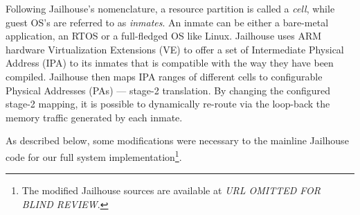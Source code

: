Following Jailhouse's nomenclature, a resource partition is called a
\emph{cell}, while guest OS's are referred to as \emph{inmates}. An
inmate can be either a bare-metal application, an RTOS or a
full-fledged OS like Linux. Jailhouse uses ARM hardware Virtualization
Extensions (VE) to offer a set of Intermediate Physical Address (IPA)
to its inmates that is compatible with the way they have been
compiled. Jailhouse then maps IPA ranges of different cells to
configurable Physical Addresses (PAs) --- stage-2 translation. By
changing the configured stage-2 mapping, it is possible to dynamically
re-route via the loop-back the memory traffic generated by each
inmate. 

As described below, some modifications were necessary to the mainline
Jailhouse code for our full system implementation\footnote{The
  modified Jailhouse sources are available at \emph{URL OMITTED FOR
    BLIND REVIEW}.}.



